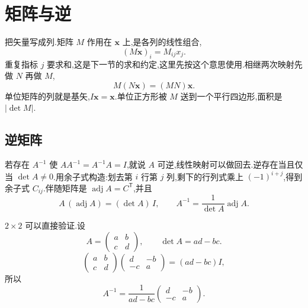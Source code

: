 \section{矩阵与逆}

把矢量写成列.矩阵 $M$ 作用在 $\mathbf{x}$ 上,是各列的线性组合,
\begin{equation}
  (M\mathbf{x})_i=M_{ij}x_j.
\end{equation}
重复指标 $j$ 要求和,这是下一节的求和约定,这里先按这个意思使用.相继两次映射先做 $N$ 再做 $M$,
\begin{equation}
  M(N\mathbf{x})=(MN)\mathbf{x}.
\end{equation}
单位矩阵的列就是基矢,$I\mathbf{x}=\mathbf{x}$.单位正方形被 $M$ 送到一个平行四边形,面积是 $|\det M|$.

\subsection{逆矩阵}
若存在 $A^{-1}$ 使 $A A^{-1}=A^{-1}A=I$,就说 $A$ 可逆,线性映射可以做回去.逆存在当且仅当 $\det A\neq 0$.用余子式构造:划去第 $i$ 行第 $j$ 列,剩下的行列式乘上 $(-1)^{i+j}$,得到余子式 $C_{ij}$.伴随矩阵是 $\operatorname{adj} A=C^{\mathsf T}$,并且
\begin{equation}
  A\,(\operatorname{adj} A)=(\det A)\,I,
  \qquad
  A^{-1}=\frac{1}{\det A}\operatorname{adj} A.
\end{equation}

$2\times 2$ 可以直接验证.设
\begin{equation}
  A=\begin{pmatrix} a & b \\ c & d \end{pmatrix},
  \qquad
  \det A=ad-bc.
\end{equation}
\begin{equation}
  \begin{pmatrix} a & b \\ c & d \end{pmatrix}
  \begin{pmatrix} d & -b \\ -c & a \end{pmatrix}
  =(ad-bc)I,
\end{equation}
所以
\begin{equation}
  A^{-1}=\frac{1}{ad-bc}\begin{pmatrix} d & -b \\ -c & a \end{pmatrix}.
\end{equation}

